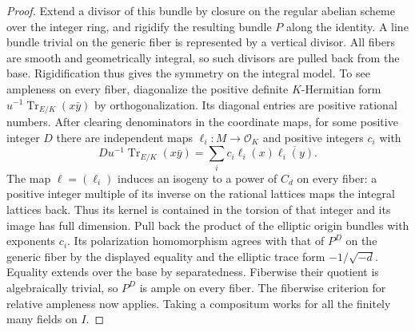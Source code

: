 \documentclass[a4paper,11pt]{article}
\theoremstyle{definition}
\theoremstyle{remark}
\numberwithin{equation}{section}
\newcommand{\OO}{\mathcal O}
\begin{document}
\begin{proof}
Extend a divisor of this bundle by closure on the regular abelian
scheme over the integer ring, and rigidify the resulting bundle \(P\)
along the identity. A line bundle trivial on the generic fiber is
represented by a vertical divisor. All fibers are smooth and
geometrically integral, so such divisors are pulled back from the
base. Rigidification thus gives the symmetry on the integral model.
To see ampleness on every fiber, diagonalize the positive definite
\(K\)-Hermitian form \(u^{-1}\operatorname{Tr}_{E/K}(x\bar y)\)
by orthogonalization. Its diagonal entries are positive rational
numbers. After clearing denominators in the coordinate maps, for
some positive integer \(D\) there are independent maps
\(\ell_i:M\to\OO_K\) and positive integers \(c_i\) with
\[
 D u^{-1}\operatorname{Tr}_{E/K}(x\bar y)
             =\sum_i c_i\ell_i(x)\overline{\ell_i(y)} .
\]
The map \(\ell=(\ell_i)\) induces an isogeny to a power of \(C_d\)
on every fiber: a positive integer multiple of its inverse on the
rational lattices maps the integral lattices back. Thus its kernel
is contained in the torsion of that integer and its image has full
dimension. Pull back the product of the elliptic origin bundles with
exponents \(c_i\). Its polarization homomorphism agrees with that of
\(P^D\) on the generic fiber by the displayed equality and the
elliptic trace form \(-1/\sqrt{-d}\). Equality extends over the base
by separatedness. Fiberwise their quotient is algebraically trivial,
so \(P^D\) is ample on every fiber. The fiberwise criterion for relative
ampleness now applies. Taking a compositum works for all the finitely
many fields on \(I\).
\end{proof}
\end{document}

